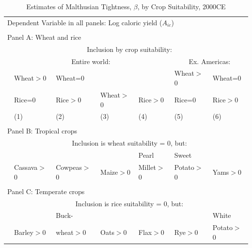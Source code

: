 \documentclass[11pt]{article}
\begin{document}
\clearpage
\begin{table}[!htb]
\begin{center}
\caption{Estimates of Malthusian Tightness, $\beta$, by Crop Suitability, 2000CE}
\label{TAB_beta_crops}
{\footnotesize
\begin{tabularx}{\textwidth}{lXXXXXX}
\midrule
\multicolumn{7}{l}{Dependent Variable in all panels: Log caloric yield ($A_{ic}$)} \\ \\
\multicolumn{7}{l}{Panel A: Wheat and rice} \\
 & \multicolumn{6}{c}{Inclusion by crop suitability:} \\ \cmidrule(lr){2-7}
 & \multicolumn{4}{c}{Entire world:} & \multicolumn{2}{c}{Ex. Americas:}\\ \cmidrule(lr){2-5} \cmidrule(lr){6-7} 
 & Wheat$>$0& Wheat=0 &         &        & Wheat$>$0   & Wheat=0   \\
 & Rice=0 & Rice$>$0  & Wheat$>$0 & Rice$>$0 & Rice=0    & Rice$>$0   \\
 & (1) & (2) & (3) & (4) & (5) & (6) \\
\midrule

\midrule
\\
\multicolumn{7}{l}{Panel B: Tropical crops} \\
                   & \multicolumn{6}{c}{Inclusion is wheat suitability = 0, but:} \\ \cmidrule(lr){2-7}
                   &            &              &          &   Pearl       &  Sweet      & \\
& Cassava$>$0 & Cowpeas$>$0  & Maize$>$0 & Millet$>$0 & Potato$>$0 & Yams$>$0   \\
\midrule

\midrule
\\
\multicolumn{7}{l}{Panel C: Temperate crops} \\
                   & \multicolumn{6}{c}{Inclusion is rice suitability = 0, but:} \\ \cmidrule(lr){2-7}
                   &            & Buck-        &          &          &         & White \\
                   & Barley$>$0 & wheat$>$0  & Oats$>$0 & Flax$>$0 & Rye$>$0 & Potato$>$0   \\
\midrule

\midrule
\end{tabularx}
}
\end{center}
\vspace{-.5cm}
\end{table}
\end{document}
